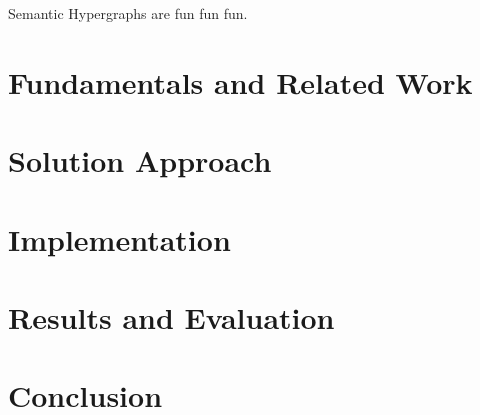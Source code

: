 \documentclass[11pt]{scrreprt}
\newcommand{\citep}{\parencite}  %
\begin{document}
Semantic Hypergraphs \citep{menezes_semantic_2021} are fun fun fun. 



\chapter{Fundamentals and Related Work}


\chapter{Solution Approach}



\chapter{Implementation}



\chapter{Results and Evaluation}



\chapter{Conclusion}








\printbibliography
\end{document}
